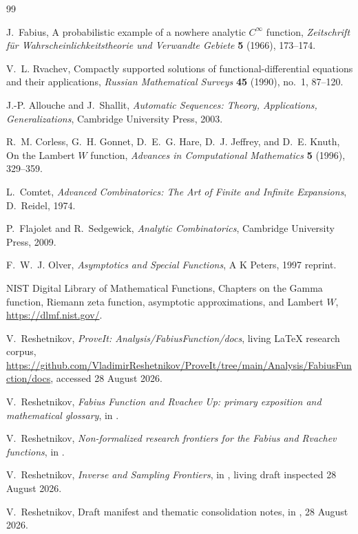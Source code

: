 \documentclass[11pt,oneside]{article}
\numberwithin{equation}{section}
\theoremstyle{definition}
\theoremstyle{remark}
\begin{document}
\begin{thebibliography}{99}

J.~Fabius,
\newblock A probabilistic example of a nowhere analytic $C^\infty$ function,
\newblock \emph{Zeitschrift f\"ur Wahrscheinlichkeitstheorie und Verwandte Gebiete} \textbf{5} (1966), 173--174.

V.~L. Rvachev,
\newblock Compactly supported solutions of functional-differential equations and their applications,
\newblock \emph{Russian Mathematical Surveys} \textbf{45} (1990), no.~1, 87--120.

J.-P. Allouche and J.~Shallit,
\newblock \emph{Automatic Sequences: Theory, Applications, Generalizations},
\newblock Cambridge University Press, 2003.

R.~M. Corless, G.~H. Gonnet, D.~E.~G. Hare, D.~J. Jeffrey, and D.~E. Knuth,
\newblock On the Lambert $W$ function,
\newblock \emph{Advances in Computational Mathematics} \textbf{5} (1996), 329--359.

L.~Comtet,
\newblock \emph{Advanced Combinatorics: The Art of Finite and Infinite Expansions},
\newblock D.~Reidel, 1974.

P.~Flajolet and R.~Sedgewick,
\newblock \emph{Analytic Combinatorics},
\newblock Cambridge University Press, 2009.

F.~W.~J. Olver,
\newblock \emph{Asymptotics and Special Functions},
\newblock A K Peters, 1997 reprint.

NIST Digital Library of Mathematical Functions,
\newblock Chapters on the Gamma function, Riemann zeta function, asymptotic approximations, and Lambert $W$,
\newblock \url{https://dlmf.nist.gov/}.

V.~Reshetnikov,
\newblock \emph{ProveIt: Analysis/FabiusFunction/docs}, living LaTeX research corpus,
\newblock \url{https://github.com/VladimirReshetnikov/ProveIt/tree/main/Analysis/FabiusFunction/docs}, accessed 28 August 2026.

V.~Reshetnikov,
\newblock \emph{Fabius Function and Rvachev Up: primary exposition and mathematical glossary},
\newblock in \cite{Repository}.

V.~Reshetnikov,
\newblock \emph{Non-formalized research frontiers for the Fabius and Rvachev functions},
\newblock in \cite{Repository}.

V.~Reshetnikov,
\newblock \emph{Inverse and Sampling Frontiers},
\newblock in \cite{Repository}, living draft inspected 28 August 2026.

V.~Reshetnikov,
\newblock Draft manifest and thematic consolidation notes,
\newblock in \cite{Repository}, 28 August 2026.

\end{thebibliography}
\end{document}
